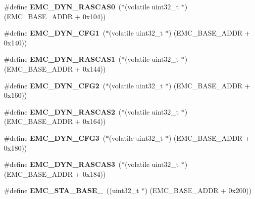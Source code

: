 \begin{DoxyCompactItemize}
\#define {\bfseries E\+M\+C\+\_\+\+D\+Y\+N\+\_\+\+R\+A\+S\+C\+A\+S0}~($\ast$(volatile uint32\+\_\+t $\ast$) (E\+M\+C\+\_\+\+B\+A\+S\+E\+\_\+\+A\+D\+DR + 0x104))
\item 
\mbox{\label{group__lpc24xx__regs_gac4e129a5d784bd6991920ab516034c07}} 
\#define {\bfseries E\+M\+C\+\_\+\+D\+Y\+N\+\_\+\+C\+F\+G1}~($\ast$(volatile uint32\+\_\+t $\ast$) (E\+M\+C\+\_\+\+B\+A\+S\+E\+\_\+\+A\+D\+DR + 0x140))
\item 
\mbox{\label{group__lpc24xx__regs_gae99cb0679de45433b9314134e78aa375}} 
\#define {\bfseries E\+M\+C\+\_\+\+D\+Y\+N\+\_\+\+R\+A\+S\+C\+A\+S1}~($\ast$(volatile uint32\+\_\+t $\ast$) (E\+M\+C\+\_\+\+B\+A\+S\+E\+\_\+\+A\+D\+DR + 0x144))
\item 
\mbox{\label{group__lpc24xx__regs_gaf5d7d23e178da56aa9d88a5adaf181d3}} 
\#define {\bfseries E\+M\+C\+\_\+\+D\+Y\+N\+\_\+\+C\+F\+G2}~($\ast$(volatile uint32\+\_\+t $\ast$) (E\+M\+C\+\_\+\+B\+A\+S\+E\+\_\+\+A\+D\+DR + 0x160))
\item 
\mbox{\label{group__lpc24xx__regs_ga1cb01916f73ec6e7589c7b092942957d}} 
\#define {\bfseries E\+M\+C\+\_\+\+D\+Y\+N\+\_\+\+R\+A\+S\+C\+A\+S2}~($\ast$(volatile uint32\+\_\+t $\ast$) (E\+M\+C\+\_\+\+B\+A\+S\+E\+\_\+\+A\+D\+DR + 0x164))
\item 
\mbox{\label{group__lpc24xx__regs_ga53a9b70a04c2fa6c692457c61daa80af}} 
\#define {\bfseries E\+M\+C\+\_\+\+D\+Y\+N\+\_\+\+C\+F\+G3}~($\ast$(volatile uint32\+\_\+t $\ast$) (E\+M\+C\+\_\+\+B\+A\+S\+E\+\_\+\+A\+D\+DR + 0x180))
\item 
\mbox{\label{group__lpc24xx__regs_gaec9ab0fb5541e15b84ae1a1f5f5a91d1}} 
\#define {\bfseries E\+M\+C\+\_\+\+D\+Y\+N\+\_\+\+R\+A\+S\+C\+A\+S3}~($\ast$(volatile uint32\+\_\+t $\ast$) (E\+M\+C\+\_\+\+B\+A\+S\+E\+\_\+\+A\+D\+DR + 0x184))
\item 
\mbox{\label{group__lpc24xx__regs_ga318b9c7d90c6e9b5443e960df156eb62}} 
\#define {\bfseries E\+M\+C\+\_\+\+S\+T\+A\+\_\+\+B\+A\+S\+E\+\_}~((uint32\+\_\+t $\ast$) (E\+M\+C\+\_\+\+B\+A\+S\+E\+\_\+\+A\+D\+DR + 0x200))
\item 

\end{DoxyCompactItemize}
